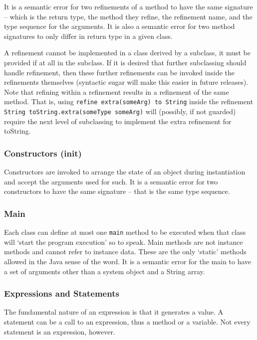 It is a semantic error for two refinements of a method to have the same signature -- which is the return type, the method they refine, the refinement name, and the type sequence for the arguments. It is also a semantic error for two method signatures to only differ in return type in a given class.

A refinement cannot be implemented in a class derived by a subclass, it must be provided if at all in the subclass. If it is desired that further subclassing should handle refinement, then these further refinements can be invoked inside the refinements themselves (syntactic sugar will make this easier in future releases). Note that refining within a refinement results in a refinement of the same method. That is, using \verb!refine extra(someArg) to String! inside the refinement \verb!String toString.extra(someType someArg)! will (possibly, if not guarded) require the next level of subclassing to implement the extra refinement for toString.

\subsubsection{Constructors (init)}
Constructors are invoked to arrange the state of an object during instantiation and accept the arguments used for such. It is a semantic error for two constructors to have the same signature -- that is the same type sequence.

\subsubsection{Main}
Each class can define at most one \verb!main! method to be executed when that class will `start the program execution' so to speak. Main methods are not instance methods and cannot refer to instance data. These are the only `static' methods allowed in the Java sense of the word. It is a semantic error for the main to have a set of arguments other than a system object and a String array.

\subsubsection{Expressions and Statements}
The fundamental nature of an expression is that it generates a value. A statement can be a call to an expression, thus a method or a variable. Not every statement is an expression, however.

